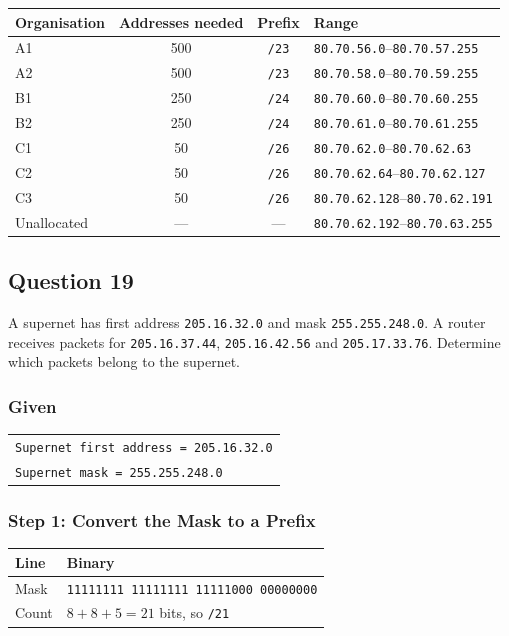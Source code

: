\documentclass[11pt,a4paper]{article}
\begin{document}
\begin{tabularx}{\textwidth}{@{}lccX@{}}
\toprule
\rowcolor{tablehead}\textbf{Organisation} & \textbf{Addresses needed} & \textbf{Prefix} & \textbf{Range} \\
\midrule
A1 & 500 & \texttt{/23} & \texttt{80.70.56.0}--\texttt{80.70.57.255} \\
A2 & 500 & \texttt{/23} & \texttt{80.70.58.0}--\texttt{80.70.59.255} \\
B1 & 250 & \texttt{/24} & \texttt{80.70.60.0}--\texttt{80.70.60.255} \\
B2 & 250 & \texttt{/24} & \texttt{80.70.61.0}--\texttt{80.70.61.255} \\
C1 & 50 & \texttt{/26} & \texttt{80.70.62.0}--\texttt{80.70.62.63} \\
C2 & 50 & \texttt{/26} & \texttt{80.70.62.64}--\texttt{80.70.62.127} \\
C3 & 50 & \texttt{/26} & \texttt{80.70.62.128}--\texttt{80.70.62.191} \\
Unallocated & --- & --- & \texttt{80.70.62.192}--\texttt{80.70.63.255} \\
\bottomrule
\end{tabularx}

\subsection*{Question 19}

A supernet has first address \texttt{205.16.32.0} and mask \texttt{255.255.248.0}. A router
receives packets for \texttt{205.16.37.44}, \texttt{205.16.42.56} and \texttt{205.17.33.76}.
Determine which packets belong to the supernet.

\subsubsection*{Given}

\begin{tabularx}{\textwidth}{@{}X@{}}
\texttt{Supernet first address = 205.16.32.0} \\
\texttt{Supernet mask = 255.255.248.0} \\
\end{tabularx}

\subsubsection*{Step 1: Convert the Mask to a Prefix}

\begin{tabularx}{\textwidth}{@{}lX@{}}
\toprule
\rowcolor{tablehead}\textbf{Line} & \textbf{Binary} \\
\midrule
Mask & \texttt{11111111 11111111 11111000 00000000} \\
Count & $8 + 8 + 5 = 21$ bits, so \texttt{/21} \\
\bottomrule
\end{tabularx}
\end{document}
